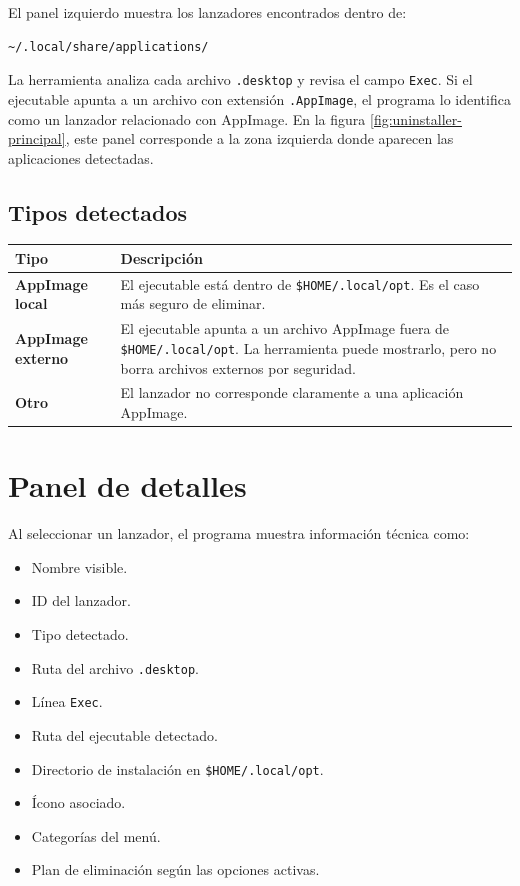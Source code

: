 \documentclass[11pt,a4paper]{article}
\begin{document}
El panel izquierdo muestra los lanzadores encontrados dentro de:

\begin{lstlisting}[style=textstyle]
~/.local/share/applications/
\end{lstlisting}

La herramienta analiza cada archivo \texttt{.desktop} y revisa el campo \texttt{Exec}. Si el ejecutable apunta a un archivo con extensión \texttt{.AppImage}, el programa lo identifica como un lanzador relacionado con AppImage. En la figura \ref{fig:uninstaller-principal}, este panel corresponde a la zona izquierda donde aparecen las aplicaciones detectadas.

\subsection{Tipos detectados}

\begin{longtable}{>{\bfseries}p{5cm}p{9cm}}
\toprule
Tipo & Descripción \\
\midrule
AppImage local & El ejecutable está dentro de \texttt{\$HOME/.local/opt}. Es el caso más seguro de eliminar. \\
AppImage externo & El ejecutable apunta a un archivo AppImage fuera de \texttt{\$HOME/.local/opt}. La herramienta puede mostrarlo, pero no borra archivos externos por seguridad. \\
Otro & El lanzador no corresponde claramente a una aplicación AppImage. \\
\bottomrule
\end{longtable}

\section{Panel de detalles}

Al seleccionar un lanzador, el programa muestra información técnica como:

\begin{itemize}[leftmargin=1.2cm]
    \item Nombre visible.
    \item ID del lanzador.
    \item Tipo detectado.
    \item Ruta del archivo \texttt{.desktop}.
    \item Línea \texttt{Exec}.
    \item Ruta del ejecutable detectado.
    \item Directorio de instalación en \texttt{\$HOME/.local/opt}.
    \item Ícono asociado.
    \item Categorías del menú.
    \item Plan de eliminación según las opciones activas.
\end{itemize}
\end{document}

